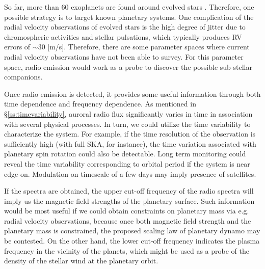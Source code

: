 \documentclass[iop,numberedappendix,apj]{emulateapj}
\def\memoYF#1{\color{red}$[${\bf #1}$]$ \color{black}}
\begin{document}
So far, more than 60 exoplanets are found around evolved stars \citep[e.g.][and references therein]{trifonov2015}. 
Therefore, one possible strategy is to target known planetary systems.  
One complication of the radial velocity observations of evolved stars is the high degree of jitter due to chromospheric activities and stellar pulsations, which typically produces RV errors of $\sim 30$ [m/s]. 
Therefore, there are some parameter spaces where current radial velocity observations have not been able to survey. For this parameter space, radio emission would work as a  probe to discover the possible sub-stellar companions. 


Once radio emission is detected, it provides some useful information through both time dependence and frequency dependence. 
As mentioned in \S\ref{ss:timevariability}, auroral radio flux significantly varies in time in association with several physical processes. In turn, we could utilize the time variability to characterize the system. For example, if the time resolution of the observation is sufficiently high (with full SKA, for instance), the time variation associated with planetary spin rotation could also be detectable. 
Long term monitoring could reveal the time variability corresponding to orbital period if the system is near edge-on. Modulation on timescale of a few days may imply presence of satellites. 

If the spectra are obtained, the upper cut-off frequency of the radio spectra will imply us the magnetic field strengths of the planetary surface. Such information would be most useful if we could obtain constraints on planetary mass via e.g. radial velocity observations, because once both magnetic field strength and the planetary mass is constrained, the proposed scaling law of planetary dynamo may be contested. On the other hand, the lower cut-off frequency indicates the plasma frequency in the vicinity of the planets, which might be used as a probe of the density of the stellar wind at the planetary orbit. 
\end{document}
